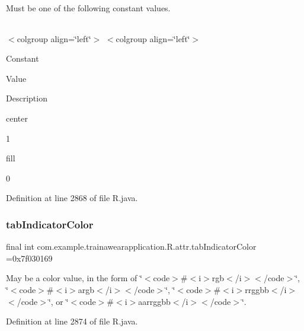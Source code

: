 Must be one of the following constant values.

\tabulinesep=1mm
\begin{longtabu}spread 0pt [c]{*{0}{|X[-1]}|}
\hline
\end{longtabu}
$<$colgroup align=\char`\"{}left\char`\"{}$>$ $<$colgroup align=\char`\"{}left\char`\"{}$>$ 

Constant

Value

Description 

center

1

fill

0

Definition at line 2868 of file R.\+java.

\mbox{\label{classcom_1_1example_1_1trainawearapplication_1_1_r_1_1attr_ad2b3d72bf91d922bd86b1bf13cd8bcc3}} 
\subsubsection{\texorpdfstring{tabIndicatorColor}{tabIndicatorColor}}
{\footnotesize\ttfamily final int com.\+example.\+trainawearapplication.\+R.\+attr.\+tab\+Indicator\+Color =0x7f030169\hspace{0.3cm}{\ttfamily [static]}}

May be a color value, in the form of \char`\"{}$<$code$>$\#$<$i$>$rgb$<$/i$>$$<$/code$>$\char`\"{}, \char`\"{}$<$code$>$\#$<$i$>$argb$<$/i$>$$<$/code$>$\char`\"{}, \char`\"{}$<$code$>$\#$<$i$>$rrggbb$<$/i$>$$<$/code$>$\char`\"{}, or \char`\"{}$<$code$>$\#$<$i$>$aarrggbb$<$/i$>$$<$/code$>$\char`\"{}. 

Definition at line 2874 of file R.\+java.

\mbox{\label{classcom_1_1example_1_1trainawearapplication_1_1_r_1_1attr_a8df20a36259c674fbacb811e1e5f96dd}} 
